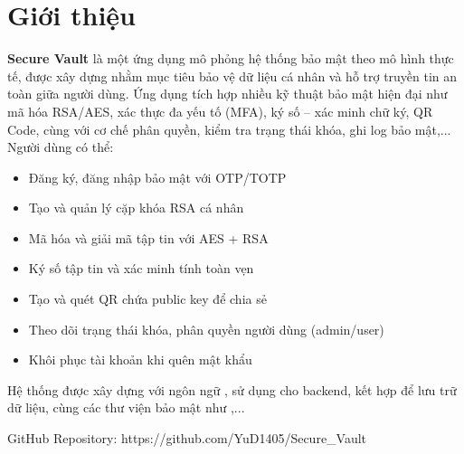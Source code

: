 \section{Giới thiệu}
\textbf{Secure Vault} là một ứng dụng mô phỏng hệ thống bảo mật theo mô hình thực tế, được xây dựng nhằm mục tiêu bảo vệ dữ liệu cá nhân và hỗ trợ truyền tin an toàn giữa người dùng. Ứng dụng tích hợp nhiều kỹ thuật bảo mật hiện đại như mã hóa RSA/AES, xác thực đa yếu tố (MFA), ký số – xác minh chữ ký, QR Code, cùng với cơ chế phân quyền, kiểm tra trạng thái khóa, ghi log bảo mật,...
Người dùng có thể:
\begin{itemize}
    \item Đăng ký, đăng nhập bảo mật với OTP/TOTP
    \item Tạo và quản lý cặp khóa RSA cá nhân
    \item Mã hóa và giải mã tập tin với AES + RSA
    \item Ký số tập tin và xác minh tính toàn vẹn
    \item Tạo và quét QR chứa public key để chia sẻ
    \item Theo dõi trạng thái khóa, phân quyền người dùng (admin/user)
    \item Khôi phục tài khoản khi quên mật khẩu
\end{itemize}

Hệ thống được xây dựng với ngôn ngữ , sử dụng  cho backend, kết hợp  để lưu trữ dữ liệu, cùng các thư viện bảo mật như ,...

GitHub Repository: https://github.com/YuD1405/Secure\_Vault
